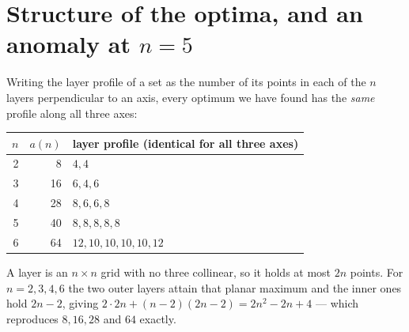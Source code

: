 \documentclass[11pt,a4paper]{article}
\begin{document}
\section{Structure of the optima, and an anomaly at $n=5$}
Writing the layer profile of a set as the number of its points in each of the $n$ layers perpendicular to an
axis, every optimum we have found has the \emph{same} profile along all three axes:
\begin{center}\begin{tabular}{rrl}\toprule
$n$ & $a(n)$ & layer profile (identical for all three axes)\\\midrule
2 & 8  & $4,4$\\
3 & 16 & $6,4,6$\\
4 & 28 & $8,6,6,8$\\
5 & 40 & $8,8,8,8,8$\\
6 & 64 & $12,10,10,10,10,12$\\\bottomrule
\end{tabular}\end{center}
A layer is an $n\times n$ grid with no three collinear, so it holds at most $2n$ points.  For $n=2,3,4,6$ the two
outer layers attain that planar maximum and the inner ones hold $2n-2$, giving $2\cdot 2n+(n-2)(2n-2)=2n^2-2n+4$
--- which reproduces $8,16,28$ and $64$ exactly.
\end{document}
